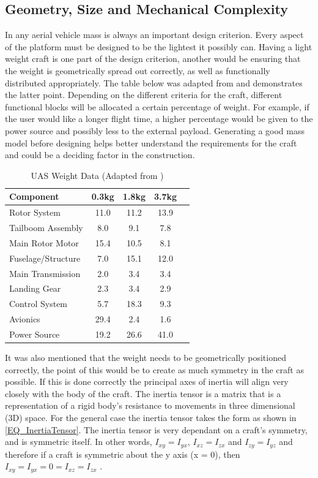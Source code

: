 \documentclass[a4paper, 10pt, conference]{ieeeconf}
\begin{document}
\subsection{Geometry, Size and Mechanical Complexity}
In any aerial vehicle mass is always an important design criterion. Every aspect of the platform must be designed to be the lightest it possibly can. Having a light weight craft is one part of the design criterion, another would be ensuring that the weight is geometrically spread out correctly, as well as functionally distributed appropriately. The table below was adapted from \cite{NewMAV} and demonstrates the latter point. Depending on the different criteria for the craft, different functional blocks will be allocated a certain percentage of weight. For example, if the user would like a longer flight time, a higher percentage would be given to the power source and possibly less to the external payload. Generating a good mass model before designing helps better understand the requirements for the craft and could be a deciding factor in the construction.

\begin{table}[H]
\centering
\begin{tabular}{l | c | c | c | c}

Component 					& 0.3kg & 1.8kg & 3.7kg\\
\hline\hline
Rotor System 				& 11.0 & 11.2 & 13.9\\
Tailboom Assembly 		& 8.0 & 9.1 & 7.8\\
Main Rotor Motor 			& 15.4 & 10.5 & 8.1\\
Fuselage/Structure 			& 7.0 &  15.1 & 12.0\\
Main Transmission 			& 2.0 &  3.4 & 3.4\\
Landing Gear 				& 2.3 &  3.4 & 2.9\\
Control System 				& 5.7 & 18.3 & 9.3\\
Avionics 						& 29.4 &  2.4 & 1.6\\
Power Source 				& 19.2 & 26.6 & 41.0\\

\end{tabular}
\caption{UAS Weight Data (Adapted from \cite{NewMAV})}
\end{table}

It was also mentioned that the weight needs to be geometrically positioned correctly, the point of this would be to create as much symmetry in the craft as possible. If this is done correctly the principal axes of inertia will align very closely with the body of the craft. The inertia tensor is a matrix that is a representation of a rigid body's resistance to movements in three dimensional (3D) space.  For the general case the inertia tensor takes the form as shown in \eqref{EQ_InertiaTensor}. The inertia tensor is very dependant on a craft's symmetry, and is symmetric itself. In other words, $I_{xy} = I_{yx}$, $I_{xz} = I_{zx}$ and $I_{zy} = I_{yz}$ and therefore if a craft is symmetric about the y axis (x = 0), then $I_{xy} = I_{yx} = 0 = I_{xz} = I_{zx}$ \cite{Luukkonen, MiniFlying}.
\end{document}
